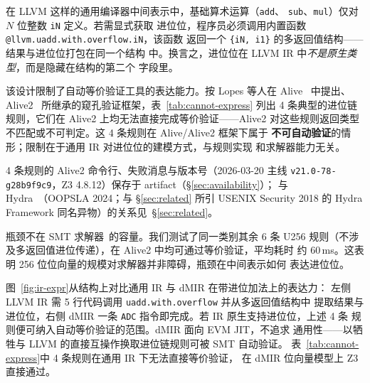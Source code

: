在 LLVM 这样的通用编译器中间表示中，基础算术运算（\texttt{add}、
\texttt{sub}、\texttt{mul}）仅对 $N$ 位整数 \texttt{iN} 定义。若需显式获取
进位位，程序员必须调用内置函数 \texttt{@llvm.uadd.with.overflow.iN}，该函数
返回一个 \texttt{\{iN, i1\}} 的多返回值结构——结果与进位位打包在同一个结构
中。换言之，进位位在 LLVM IR 中\emph{不是原生类型}，而是隐藏在结构的第二个
字段里。

该设计限制了自动等价验证工具的表达能力。按 Lopes 等人在 Alive~\cite{alive}
中提出、Alive2~\cite{alive2} 所继承的窥孔验证框架，表~\ref{tab:cannot-express}
列出 4 条典型的进位链规则，它们在 Alive2 上均无法直接完成等价验证——Alive2
对这些规则返回类型不匹配或不可判定。这 4 条规则在 Alive/Alive2 框架下属于
\textbf{不可自动验证}的情形；限制在于通用 IR 对进位位的建模方式，与规则实现
和求解器能力无关。



4 条规则的 Alive2 命令行、失败消息与版本号（2026-03-20 主线
\texttt{v21.0-78-g28b9f9c9}，Z3 4.8.12）保存于 artifact（\S\ref{sec:availability}）；
与 Hydra~\cite{hydra}（OOPSLA 2024；与 \S\ref{sec:related} 所引 USENIX
Security 2018 的 Hydra Framework 同名异物）的关系见~\S\ref{sec:related}。

瓶颈不在 SMT 求解器~\cite{demoura2008z3}的容量。我们测试了同一类别其余 6 条
U256 规则（不涉及多返回值进位传递），在 Alive2 中均可通过等价验证，平均耗时
约 60\,ms。这表明 256 位位向量的规模对求解器并非障碍，瓶颈在中间表示如何
表达进位位。



图~\ref{fig:ir-expr}从结构上对比通用 IR 与 dMIR 在带进位加法上的表达力：
左侧 LLVM IR 需 5 行代码调用 \texttt{uadd.with.overflow} 并从多返回值结构中
提取结果与进位位，右侧 dMIR 一条 \texttt{ADC} 指令即完成。若 IR 原生支持进位位，上述 4 条
规则便可纳入自动等价验证的范围。dMIR 面向 EVM JIT，不追求
通用性——以牺牲与 LLVM 的直接互操作换取进位链规则可被 SMT 自动验证。
表~\ref{tab:cannot-express}中 4 条规则在通用 IR 下无法直接等价验证，
在 dMIR 位向量模型上 Z3 直接通过。
